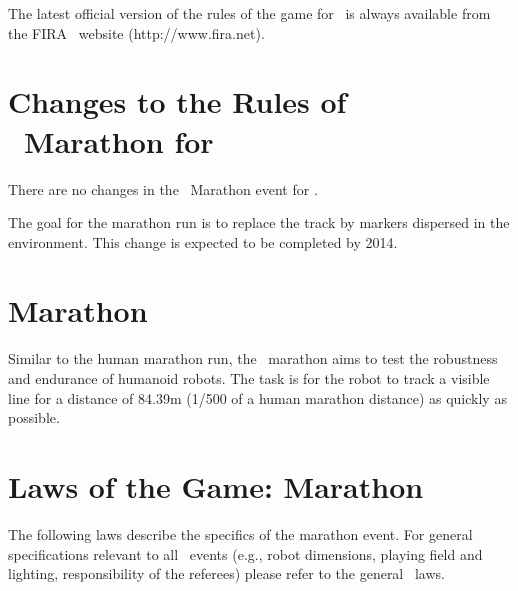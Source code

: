 \documentclass[12pt]{hurocup}
\begin{document}
The latest official version of the rules of the game for \HuroCup\ is
always available from the FIRA \HuroCup\ website (http://www.fira.net).

\section*{Changes to the Rules of \HuroCup\ Marathon for \thisyear}

There are no changes in the \HuroCup\ Marathon event for \thisyear.

The goal for the marathon run is to replace the track by markers
dispersed in the environment. This change is expected to be completed
by 2014.

\newpage

\section{Marathon}
\label{sec:marathon} 

Similar to the human marathon run, the \HuroCup\ marathon aims to test
the robustness and endurance of humanoid robots. The task is for the
robot to track a visible line for a distance of 84.39m (1/500 of a
human marathon distance) as quickly as possible. 

\section{Laws of the Game: Marathon}
\label{sec:marathon-laws}

The following laws describe the specifics of the marathon
event. For general specifications relevant to all \HuroCup\ events
(e.g., robot dimensions, playing field and lighting, responsibility of
the referees) please refer to the general \HuroCup\ laws.

\label{mr-field}
\end{document}
